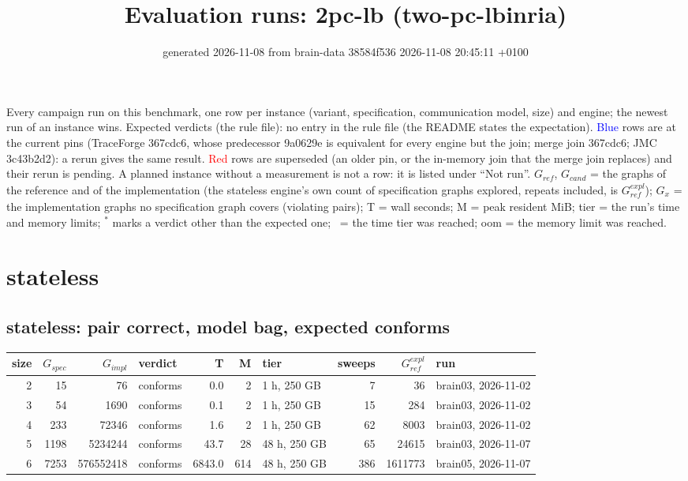 \documentclass[10pt]{article}
\title{Evaluation runs: \textsf{2pc-lb} (two-pc-lbinria)}
\author{}
\date{generated 2026-11-08 from brain-data 38584f536 2026-11-08 20:45:11 +0100}
\begin{document}
\maketitle\small
\noindent Every campaign run on this benchmark, one row per instance (variant, specification, communication model, size) and engine; the newest run of an instance wins. Expected verdicts (the rule file): no entry in the rule file (the README states the expectation). \textcolor{blue}{Blue} rows are at the current pins (TraceForge 367cdc6, whose predecessor 9a0629e is equivalent for every engine but the join; merge join 367cdc6; JMC 3c43b2d2): a rerun gives the same result. \textcolor{red}{Red} rows are superseded (an older pin, or the in-memory join that the merge join replaces) and their rerun is pending. A planned instance without a measurement is not a row: it is listed under ``Not run''. $G_{\mathit{ref}}$, $G_{\mathit{cand}}$ = the graphs of the reference and of the implementation (the stateless engine's own count of specification graphs explored, repeats included, is $G_{\mathit{ref}}^{\mathit{expl}}$); $G_x$ = the implementation graphs no specification graph covers (violating pairs); T = wall seconds; M = peak resident MiB; tier = the run's time and memory limits; $^{\ast}$ marks a verdict other than the expected one; \faClock\ = the time tier was reached; oom = the memory limit was reached.

\section*{stateless}
\subsection*{stateless: pair \textsf{correct}, model bag, expected conforms}
\begin{longtable}{@{}rrrlrrlrrl@{}}
\toprule
size & $G_{\mathit{spec}}$ & $G_{\mathit{impl}}$ & verdict & T & M & tier & sweeps & $G_{\mathit{ref}}^{\mathit{expl}}$ & run \\
\midrule
\endhead
\color{blue} 2 & 15 & 76 & conforms & 0.0 & 2 & 1 h, 250 GB & 7 & 36 & brain03, 2026-11-02 \\
\color{blue} 3 & 54 & 1690 & conforms & 0.1 & 2 & 1 h, 250 GB & 15 & 284 & brain03, 2026-11-02 \\
\color{blue} 4 & 233 & 72346 & conforms & 1.6 & 2 & 1 h, 250 GB & 62 & 8003 & brain03, 2026-11-02 \\
\color{blue} 5 & 1198 & 5234244 & conforms & 43.7 & 28 & 48 h, 250 GB & 65 & 24615 & brain03, 2026-11-07 \\
\color{blue} 6 & 7253 & 576552418 & conforms & 6843.0 & 614 & 48 h, 250 GB & 386 & 1611773 & brain05, 2026-11-07 \\
\bottomrule
\end{longtable}
\end{document}
